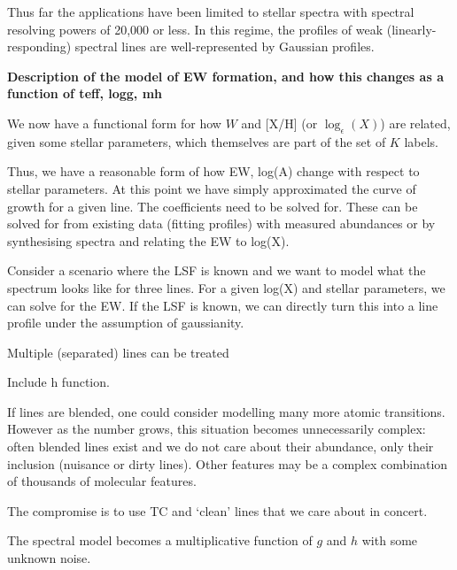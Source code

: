 \documentclass[useAMS,usenatbib]{mn2e}
\begin{document}


Thus far the applications
have been limited to stellar spectra with spectral resolving powers of 20,000
or less. In this regime, the profiles of weak (linearly-responding) spectral lines
are well-represented by Gaussian profiles.



\textbf{Description of the model of EW formation, and how this changes as a function of teff, logg, mh}


We now have a functional form for how $W$ and [X/H] (or $\log_{\epsilon}(X)$) are related, given some stellar parameters, which themselves are part of the set of $K$ labels. 


Thus, we have a reasonable form of how EW, log(A) change with respect to
stellar parameters. At this point we have simply approximated the curve of growth
for a given line. The coefficients need to be solved for. These can be solved for
from existing data (fitting profiles) with measured abundances or by synthesising
spectra and relating the EW to log(X).


Consider a scenario where the LSF is known and we want to model what the
spectrum looks like for three lines. For a given log(X) and stellar parameters,
we can solve for the EW. If the LSF is known, we can directly turn this into a
line profile under the assumption of gaussianity.

Multiple (separated) lines can be treated

Include h function.

If lines are blended, one could consider modelling many more atomic transitions.
However as the number grows, this situation becomes unnecessarily complex:
often blended lines exist and we do not care about their abundance, only their
inclusion (nuisance or dirty lines). Other features may be a complex combination
of thousands of molecular features.

The compromise is to use TC and `clean' lines that we care about in concert.

The spectral model becomes a multiplicative function of $g$ and $h$ with some
unknown noise.
\end{document}
